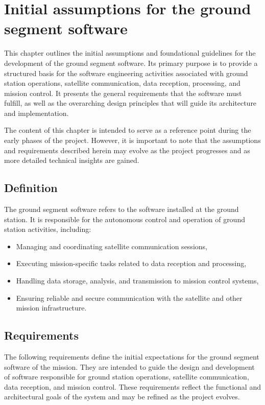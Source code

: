 
\chapter{Initial assumptions for the ground segment software}
\label{chpt:03-02-01-initial-ground-segment-sofware}

This chapter outlines the initial assumptions and foundational guidelines for the development of the ground segment software. Its primary purpose is to provide a structured basis for the software engineering activities associated with ground station operations, satellite communication, data reception, processing, and mission control. It presents the general requirements that the software must fulfill, as well as the overarching design principles that will guide its architecture and implementation.

The content of this chapter is intended to serve as a reference point during the early phases of the project. However, it is important to note that the assumptions and requirements described herein may evolve as the project progresses and as more detailed technical insights are gained.

\section{Definition}

The ground segment software refers to the software installed at the ground station. It is responsible for the autonomous control and operation of ground station activities, including:

\begin{itemize}
    \item Managing and coordinating satellite communication sessions,
    \item Executing mission-specific tasks related to data reception and processing,
    \item Handling data storage, analysis, and transmission to mission control systems,
    \item Ensuring reliable and secure communication with the satellite and other mission infrastructure.
\end{itemize}

\section{Requirements}

The following requirements define the initial expectations for the ground segment software of the mission. They are intended to guide the design and development of software responsible for ground station operations, satellite communication, data reception, and mission control. These requirements reflect the functional and architectural goals of the system and may be refined as the project evolves.

